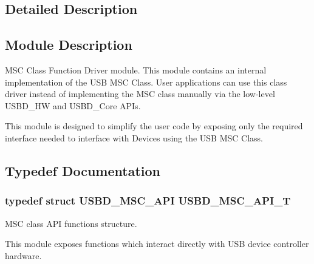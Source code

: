 \subsection{Detailed Description}
\hypertarget{group__USBD__MSC_Sec_MSCModDescription}{}\subsection{Module Description}\label{group__USBD__MSC_Sec_MSCModDescription}
M\-S\-C Class Function Driver module. This module contains an internal implementation of the U\-S\-B M\-S\-C Class. User applications can use this class driver instead of implementing the M\-S\-C class manually via the low-\/level U\-S\-B\-D\-\_\-\-H\-W and U\-S\-B\-D\-\_\-\-Core A\-P\-Is.

This module is designed to simplify the user code by exposing only the required interface needed to interface with Devices using the U\-S\-B M\-S\-C Class. 

\subsection{Typedef Documentation}
\hypertarget{group__USBD__MSC_ga521bb0e0edf4060aeb10827c6c29f7cf}{
\subsubsection[{U\-S\-B\-D\-\_\-\-M\-S\-C\-\_\-\-A\-P\-I\-\_\-\-T}]{\setlength{\rightskip}{0pt plus 5cm}typedef struct {\bf U\-S\-B\-D\-\_\-\-M\-S\-C\-\_\-\-A\-P\-I}  {\bf U\-S\-B\-D\-\_\-\-M\-S\-C\-\_\-\-A\-P\-I\-\_\-\-T}}}\label{group__USBD__MSC_ga521bb0e0edf4060aeb10827c6c29f7cf}


M\-S\-C class A\-P\-I functions structure.

This module exposes functions which interact directly with U\-S\-B device controller hardware. 

